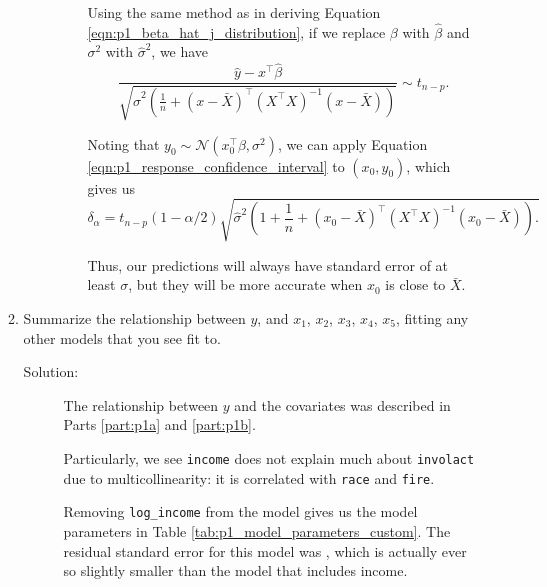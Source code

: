 \documentclass[letterpaper,11pt]{article}
\begin{document}
\begin{enumerate}
\begin{enumerate}
\begin{enumerate}
\begin{description}
        Using the same method as in deriving Equation
        \ref{eqn:p1_beta_hat_j_distribution}, if we replace $\beta$ with
        $\hat{\beta}$ and $\sigma^2$ with $\hat{\sigma}^2$, we have
        \begin{equation}
          \frac{\hat{y} - x^\intercal\hat{\beta}}{
            \sqrt{\hat{\sigma}^2\left(\frac{1}{n} +
              \left(x - \bar{X}\right)^\intercal
              \left(X^\intercal X\right)^{-1}
              \left(x - \bar{X}\right)\right)}}
          \sim t_{n-p}.
          \label{eqn:p1_response_confidence_interval}
        \end{equation}

        Noting that
        $y_0 \sim \mathcal{N}\left(x_0^\intercal\beta, \sigma^2\right)$, we can
        apply Equation \ref{eqn:p1_response_confidence_interval} to
        $\left(x_0, y_0\right)$, which gives us
        \begin{equation*}
          \boxed{
            \delta_\alpha
            =
            t_{n-p}\left(1 - \alpha/2\right)
            \sqrt{\hat{\sigma}^2\left(
                1 + \frac{1}{n} +
                \left(x_0 - \bar{X}\right)^\intercal
                \left(X^\intercal X\right)^{-1}
                \left(x_0 - \bar{X}\right)
              \right).
            }
          }
        \end{equation*}

        Thus, our predictions will always have standard error of at least
        $\sigma$, but they will be more accurate when $x_0$ is close to
        $\bar{X}$.
      \end{description}
    \end{enumerate}
  \item Summarize the relationship between $y$, and $x_1$, $x_2$, $x_3$, $x_4$,
    $x_5$, fitting any other models that you see fit to.

    \begin{description}
    \item[Solution:] The relationship between $y$ and the covariates was
      described in Parts \ref{part:p1a} and \ref{part:p1b}.

      Particularly, we see \texttt{income} does not explain much about
      \texttt{involact} due to multicollinearity: it is correlated with
      \texttt{race} and \texttt{fire}.

      Removing \texttt{log\_income} from the model gives us the model parameters
      in Table \ref{tab:p1_model_parameters_custom}. The residual standard error
      for this model was \unskip,
      which is actually ever so slightly smaller than the model that includes
      income.


\end{description}
\end{enumerate}
\end{enumerate}
\end{document}
